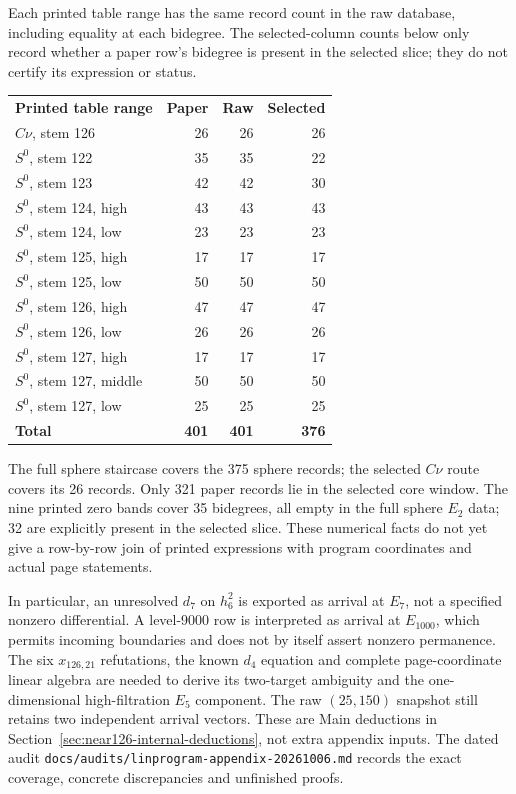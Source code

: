 Each printed table range has the same record count in the raw database,
including equality at each bidegree. The selected-column counts below only
record whether a paper row's bidegree is present in the selected slice;
they do not certify its expression or status.
\begin{center}
\begin{tabular}{lrrr}
\textbf{Printed table range} & \textbf{Paper} & \textbf{Raw} & \textbf{Selected} \\
$C\nu$, stem 126 & 26 & 26 & 26 \\
$S^0$, stem 122 & 35 & 35 & 22 \\
$S^0$, stem 123 & 42 & 42 & 30 \\
$S^0$, stem 124, high & 43 & 43 & 43 \\
$S^0$, stem 124, low & 23 & 23 & 23 \\
$S^0$, stem 125, high & 17 & 17 & 17 \\
$S^0$, stem 125, low & 50 & 50 & 50 \\
$S^0$, stem 126, high & 47 & 47 & 47 \\
$S^0$, stem 126, low & 26 & 26 & 26 \\
$S^0$, stem 127, high & 17 & 17 & 17 \\
$S^0$, stem 127, middle & 50 & 50 & 50 \\
$S^0$, stem 127, low & 25 & 25 & 25 \\
\textbf{Total} & \textbf{401} & \textbf{401} & \textbf{376}
\end{tabular}
\end{center}

The full sphere staircase covers the 375 sphere records; the selected
$C\nu$ route covers its 26 records. Only 321 paper records lie in the
selected core window. The nine printed zero bands cover 35 bidegrees,
all empty in the full sphere $E_2$ data; 32 are explicitly present in the
selected slice. These numerical facts do not yet give a row-by-row join of
printed expressions with program coordinates and actual page statements.

In particular, an unresolved $d_7$ on $h_6^2$ is exported as arrival at
$E_7$, not a specified nonzero differential. A level-9000 row is interpreted
as arrival at $E_{1000}$, which permits incoming boundaries and does not
by itself assert nonzero permanence. The six $x_{126,21}$ refutations,
the known $d_4$ equation and complete page-coordinate linear algebra
are needed to derive its two-target ambiguity and the one-dimensional
high-filtration $E_5$ component. The raw $(25,150)$ snapshot still retains
two independent arrival vectors. These are Main deductions in
Section~\ref{sec:near126-internal-deductions}, not extra appendix inputs.
The dated audit \texttt{docs/audits/linprogram-appendix-20261006.md}
records the exact coverage, concrete discrepancies and unfinished proofs.


